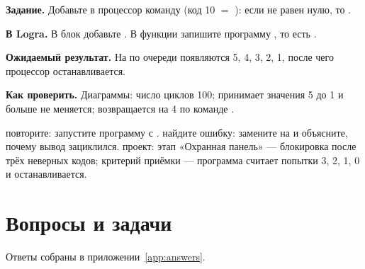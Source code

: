 \begin{diybox}
\textbf{Задание.} Добавьте в процессор команду  (код 10 $=$ ): если  не равен нулю, то .

\textbf{В Logra.} В блок  добавьте . В функции  запишите программу , то есть .

\textbf{Ожидаемый результат.} На  по очереди появляются 5, 4, 3, 2, 1, после чего процессор останавливается.

\textbf{Как проверить.} Диаграммы: число циклов 100;  принимает значения 5 до 1 и больше не меняется;  возвращается на 4 по команде .

 повторите: запустите программу с .  найдите ошибку: замените  на  и объясните, почему вывод зациклился.  проект: этап «Охранная панель» --- блокировка после трёх неверных кодов; критерий приёмки --- программа считает попытки 3, 2, 1, 0 и останавливается.
\end{diybox}

\section{Вопросы и задачи}
\label{sec:tasks-cpu}

Ответы собраны в приложении~\ref{app:answers}.

